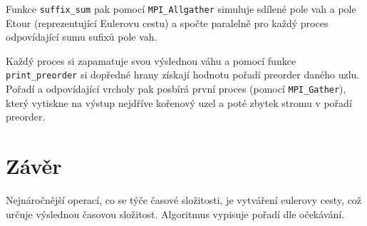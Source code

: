 \documentclass[12pt,a4paper]{article}
\begin{document}
Funkce \texttt{suffix\_sum} pak pomocí \texttt{MPI\_Allgather} simuluje sdílené pole vah a pole Etour (reprezentující Eulerovu cestu) a spočte paralelně pro každý proces odpovídající sumu sufixů pole vah.

Každý proces si zapamatuje svou výslednou váhu a pomocí funkce \texttt{print\_preorder} si dopředné hrany získají hodnotu pořadí preorder daného uzlu. 
Pořadí a odpovídající vrcholy pak posbírá první proces (pomocí \texttt{MPI\_Gather}), který vytiskne na výstup nejdříve kořenový uzel a poté zbytek stromu v pořadí preorder.

\section{Závěr}
\label{sec:závěr}
Nejnáročnější operací, co se týče časové složitosti, je vytváření eulerovy cesty, což určuje výslednou časovou složitost. 
Algoritmus vypisuje pořadí dle očekávání.
\end{document}

